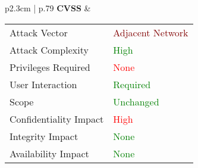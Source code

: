 \begin{longtable}{ p{2.3cm} | p{.79\linewidth} }
    \textbf{CVSS} & 
        \begin{tabular}[t]{@{}l | l}
            Attack Vector           & \textcolor{Maroon}{Adjacent Network} \\
            Attack Complexity       & \textcolor{Green}{High} \\
            Privileges Required     & \textcolor{red}{None} \\
            User Interaction        & \textcolor{Green}{Required} \\
            Scope                   & \textcolor{Green}{Unchanged} \\
            Confidentiality Impact  & \textcolor{red}{High} \\
            Integrity Impact        & \textcolor{Green}{None} \\
            Availability Impact     & \textcolor{Green}{None}
        \end{tabular} \\
   	\hline
\end{longtable}

